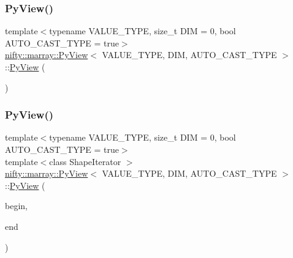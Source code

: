 \mbox{\label{classnifty_1_1marray_1_1PyView_afe98775fe6a9b821f3e98f97b352f980}} 
\subsubsection{\texorpdfstring{Py\+View()}{PyView()}\hspace{0.1cm}{\footnotesize\ttfamily [2/4]}}
{\footnotesize\ttfamily template$<$typename V\+A\+L\+U\+E\+\_\+\+T\+Y\+PE, size\+\_\+t D\+IM = 0, bool A\+U\+T\+O\+\_\+\+C\+A\+S\+T\+\_\+\+T\+Y\+PE = true$>$ \\
\hyperlink{classnifty_1_1marray_1_1PyView}{nifty\+::marray\+::\+Py\+View}$<$ V\+A\+L\+U\+E\+\_\+\+T\+Y\+PE, D\+IM, A\+U\+T\+O\+\_\+\+C\+A\+S\+T\+\_\+\+T\+Y\+PE $>$\+::\hyperlink{classnifty_1_1marray_1_1PyView}{Py\+View} (\begin{DoxyParamCaption}{ }\end{DoxyParamCaption})\hspace{0.3cm}{\ttfamily [inline]}}

\mbox{\label{classnifty_1_1marray_1_1PyView_aceeb7d7fb74e9dad8a6d930440dfb780}} 
\subsubsection{\texorpdfstring{Py\+View()}{PyView()}\hspace{0.1cm}{\footnotesize\ttfamily [3/4]}}
{\footnotesize\ttfamily template$<$typename V\+A\+L\+U\+E\+\_\+\+T\+Y\+PE, size\+\_\+t D\+IM = 0, bool A\+U\+T\+O\+\_\+\+C\+A\+S\+T\+\_\+\+T\+Y\+PE = true$>$ \\
template$<$class Shape\+Iterator $>$ \\
\hyperlink{classnifty_1_1marray_1_1PyView}{nifty\+::marray\+::\+Py\+View}$<$ V\+A\+L\+U\+E\+\_\+\+T\+Y\+PE, D\+IM, A\+U\+T\+O\+\_\+\+C\+A\+S\+T\+\_\+\+T\+Y\+PE $>$\+::\hyperlink{classnifty_1_1marray_1_1PyView}{Py\+View} (\begin{DoxyParamCaption}\item[{Shape\+Iterator}]{begin,  }\item[{Shape\+Iterator}]{end }\end{DoxyParamCaption})\hspace{0.3cm}{\ttfamily [inline]}}

